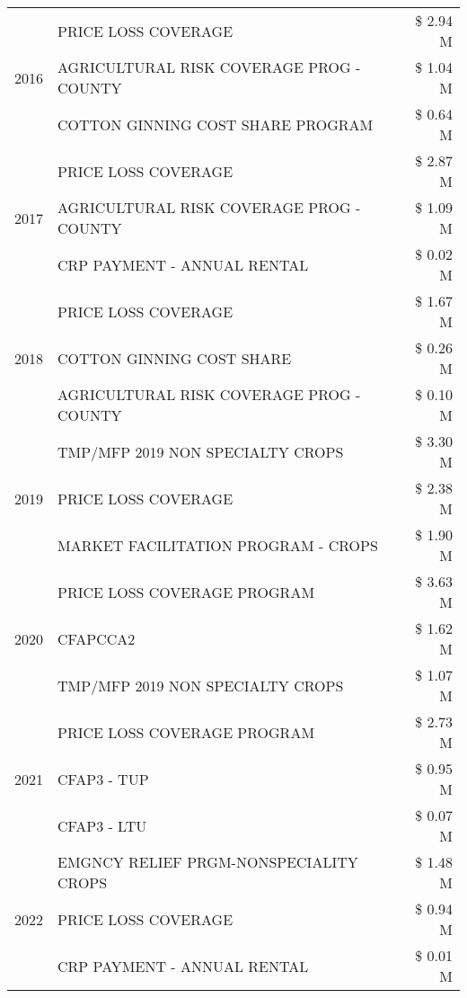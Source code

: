 \begin{tabular}{llr}
\cline{1-3}
\multirow[t]{3}{*}{2016} & PRICE LOSS COVERAGE & \$ 2.94 M \\
 & AGRICULTURAL RISK COVERAGE PROG - COUNTY & \$ 1.04 M \\
 & COTTON GINNING COST SHARE PROGRAM & \$ 0.64 M \\
\cline{1-3}
\multirow[t]{3}{*}{2017} & PRICE LOSS COVERAGE & \$ 2.87 M \\
 & AGRICULTURAL RISK COVERAGE PROG - COUNTY & \$ 1.09 M \\
 & CRP PAYMENT - ANNUAL RENTAL & \$ 0.02 M \\
\cline{1-3}
\multirow[t]{3}{*}{2018} & PRICE LOSS COVERAGE & \$ 1.67 M \\
 & COTTON GINNING COST SHARE & \$ 0.26 M \\
 & AGRICULTURAL RISK COVERAGE PROG - COUNTY & \$ 0.10 M \\
\cline{1-3}
\multirow[t]{3}{*}{2019} & TMP/MFP 2019 NON SPECIALTY CROPS & \$ 3.30 M \\
 & PRICE LOSS COVERAGE & \$ 2.38 M \\
 & MARKET FACILITATION PROGRAM - CROPS & \$ 1.90 M \\
\cline{1-3}
\multirow[t]{3}{*}{2020} & PRICE LOSS COVERAGE PROGRAM & \$ 3.63 M \\
 & CFAPCCA2 & \$ 1.62 M \\
 & TMP/MFP 2019 NON SPECIALTY CROPS & \$ 1.07 M \\
\cline{1-3}
\multirow[t]{3}{*}{2021} & PRICE LOSS COVERAGE PROGRAM & \$ 2.73 M \\
 & CFAP3 - TUP & \$ 0.95 M \\
 & CFAP3 - LTU & \$ 0.07 M \\
\cline{1-3}
\multirow[t]{3}{*}{2022} & EMGNCY RELIEF PRGM-NONSPECIALITY CROPS & \$ 1.48 M \\
 & PRICE LOSS COVERAGE & \$ 0.94 M \\
 & CRP PAYMENT - ANNUAL RENTAL & \$ 0.01 M \\
\cline{1-3}
\bottomrule
\end{tabular}
